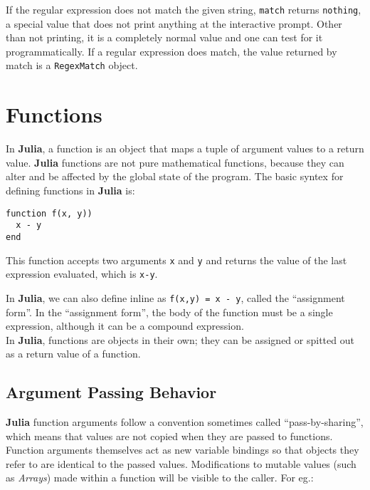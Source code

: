 \documentclass[
]{article}
\begin{document}
If the regular expression does not match the given string,
\texttt{match} returns \texttt{nothing}, a special value that does not
print anything at the interactive prompt. Other than not printing, it is
a completely normal value and one can test for it programmatically. If a
regular expression does match, the value returned by match is a
\texttt{RegexMatch} object.

\newpage

\hypertarget{functions}{%
\section{Functions}\label{functions}}

In \textbf{Julia}, a function is an object that maps a tuple of argument
values to a return value. \textbf{Julia} functions are not pure
mathematical functions, because they can alter and be affected by the
global state of the program. The basic syntex for defining functions in
\textbf{Julia} is:

\begin{verbatim}
function f(x, y))
  x - y
end
\end{verbatim}

This function accepts two arguments \texttt{x} and \texttt{y} and
returns the value of the last expression evaluated, which is
\texttt{x-y}.

In \textbf{Julia}, we can also define inline as
\texttt{f(x,y)\ =\ x\ -\ y}, called the ``assignment form''. In the
``assignment form'', the body of the function must be a single
expression, although it can be a compound expression.\\
In \textbf{Julia}, functions are objects in their own; they can be
assigned or spitted out as a return value of a function.

\hypertarget{argument-passing-behavior}{%
\subsection{Argument Passing Behavior}\label{argument-passing-behavior}}

\textbf{Julia} function arguments follow a convention sometimes called
``pass-by-sharing'', which means that values are not copied when they
are passed to functions. Function arguments themselves act as new
variable bindings so that objects they refer to are identical to the
passed values. Modifications to mutable values (such as \emph{Arrays})
made within a function will be visible to the caller. For eg.:
\end{document}
